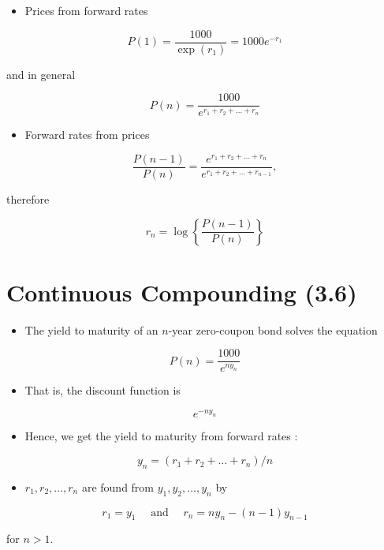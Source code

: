 \documentclass[letterpaper]{article}
\begin{document}
\begin{itemize}
  \item Prices from forward rates
\end{itemize}

$$
P(1)=\frac{1000}{\exp \left(r_{1}\right)}=1000 e^{-r_{1}}
$$

and in general

$$
P(n)=\frac{1000}{e^{r_{1}+r_{2}+\ldots+r_{n}}}
$$

\begin{itemize}
  \item Forward rates from prices
\end{itemize}

$$
\frac{P(n-1)}{P(n)}=\frac{e^{r_{1}+r_{2}+\ldots+r_{n}}}{e^{r_{1}+r_{2}+\ldots+r_{n-1}}},
$$

therefore

$$
r_{n}=\log \left\{\frac{P(n-1)}{P(n)}\right\}
$$

\section*{Continuous Compounding (3.6)}
\begin{itemize}
  \item The yield to maturity of an $n$-year zero-coupon bond solves the equation
\end{itemize}

$$
P(n)=\frac{1000}{e^{n y_{n}}}
$$

\begin{itemize}
  \item That is, the discount function is
\end{itemize}

$$
e^{-n y_{n}}
$$

\begin{itemize}
  \item Hence, we get the yield to maturity from forward rates :
\end{itemize}

$$
y_{n}=\left(r_{1}+r_{2}+\ldots+r_{n}\right) / n
$$

\begin{itemize}
  \item $r_{1}, r_{2}, \ldots, r_{n}$ are found from $y_{1}, y_{2}, \ldots, y_{n}$ by
\end{itemize}

$$
r_{1}=y_{1} \quad \text { and } \quad r_{n}=n y_{n}-(n-1) y_{n-1}
$$

for $n>1$.
\end{document}
